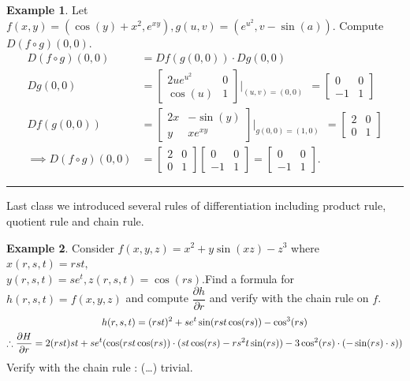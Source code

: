 \documentclass[
	12pt,
	]{article}
\theoremstyle{custom}
\theoremstyle{custom}
\theoremstyle{custom}
\theoremstyle{custom}
\theoremstyle{custom}
\theoremstyle{definition}
\newtheorem{example}{Example}[section]
\theoremstyle{example}
\theoremstyle{note}
\theoremstyle{remark}
\theoremstyle{example}
\newcounter{theo}[section]\setcounter{theo}{0}
\numberwithin{equation}{subsection}
\begin{document}
  		\begin{example}
  			Let $f(x,y) = (\cos(y) + x^{2} , e^{xy}) , g(u,v) = (e^{u^{2}} , v-\sin(a))$. Compute $D(f\circ g)(0,0)$.
  			\begin{align*}
  				D(f\circ g)(0,0) &= D{f}(g(0,0))\cdot D{g}(0,0) \\
  				D{g}(0,0) &= 
  				\begin{bmatrix}
  					2ue^{u^{2}} & 0 \\
  					\cos(u) & 1 
  				\end{bmatrix}\bigg|_{(u,v) = (0,0)}
  				\ \ = 
  				\begin{bmatrix}
  					0 & 0 \\
  					-1 & 1
  				\end{bmatrix} \\
  				D{f}(g(0,0)) &= 
  				\begin{bmatrix}
  					2x & -\sin(y) \\
  					y & xe^{xy} 
  				\end{bmatrix}\bigg|_{g(0,0) = (1,0)}
  				\ \ = 
  				\begin{bmatrix}
  					2 & 0 \\
  					0 & 1
  				\end{bmatrix} \\
  				\implies D{(f\circ g)}(0,0) &= 
  				\begin{bmatrix}
  					2 & 0 \\
  					0 & 1 
  				\end{bmatrix}
  				\begin{bmatrix}
  					0 & 0 \\
  					-1 & 1 
  				\end{bmatrix}
  				=
  				\begin{bmatrix}
  					0 & 0 \\
  					-1 & 1
  				\end{bmatrix}.
  			\end{align*}
  		\end{example}
  		
  		\rule{\linewidth}{0.4 pt}
  		
  		\noindent Last class we introduced several rules of differentiation including product rule, quotient rule and chain rule. 
  		\begin{example}
  			Consider $f(x,y,z) = x^{2}+y\sin(xz) - z^{3}$ where $x(r,s,t) = rst , \ $\\ ${y(r,s,t) = se^{t} , z(r,s,t) = \cos(rs)}$.Find a formula for $h(r,s,t) = f(x,y,z)$ and compute $\dfrac{\partial h}{\partial r}$ and verify with the chain rule on $f$.
  			\begin{gather*}
  				h(r,s,t) = (rst)^{2}+se^{t}\sin(rst\cos(rs))-\cos^{3}(rs) \\
  				\therefore \pdv{H}{r} = 2(rst)st + se^{t}(\cos(rst\cos(rs))\cdot (st\cos(rs) -rs^{2}t\sin(rs)) -3\cos^{2}(rs)\cdot(-\sin(rs)\cdot s))
  			\end{gather*}
  			Verify with the chain rule : (\dots) trivial.
  		\end{example}
  		
\end{document}
